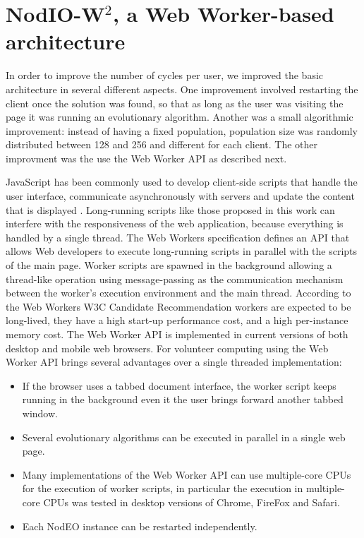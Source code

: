 \documentclass[journal,onecolumn]{IEEEtran}
\begin{document}
\section{{\sf NodIO-W$^2$}, a Web Worker-based architecture}

In order to improve the number of cycles per user, we improved the
basic architecture in several different aspects.  One improvement 
involved restarting the client once the solution was
found, so that as long as the user was visiting the page it was
running an evolutionary algorithm. Another was a small algorithmic
improvement: instead of having a fixed population,
population size was randomly distributed between 128 and 256 and
different for each client.  The other improvment was the 
use the Web Worker API as described next.

JavaScript has been commonly used to develop client-side scripts
that handle the user interface, communicate asynchronously with servers and
update the content that is displayed \cite{flanagan2006javascript}.
Long-running scripts like those proposed in this work can interfere with the
responsiveness of the web application, because everything is handled by a
single thread. The Web Workers specification \cite{hickson2012web} defines an
API that allows Web developers to execute long-running scripts in parallel
with the scripts of the main page. Worker scripts are spawned in the
background allowing a thread-like operation using message-passing as the
communication mechanism between the worker's execution environment and the
main thread. According to the Web Workers W3C Candidate Recommendation
\cite{hickson2012web} workers are expected to be long-lived, they have a high
start-up performance cost, and a high per-instance memory cost. The Web Worker
API is implemented in current versions of both desktop and mobile web browsers.
For volunteer computing using the Web Worker API brings several advantages
over a single threaded implementation:

\begin{itemize}
\item If the browser uses a tabbed document interface, the worker script
keeps running in the background even it the user brings forward another tabbed
window.
\item Several evolutionary algorithms can be executed in parallel in a single web
page. 
\item Many implementations of the Web Worker API can use multiple-core CPUs for
the execution of worker scripts, in particular the execution in multiple-core CPUs
was tested in desktop versions of Chrome, FireFox and Safari.
\item Each NodEO instance can be restarted independently.
\end{itemize}
\end{document}
